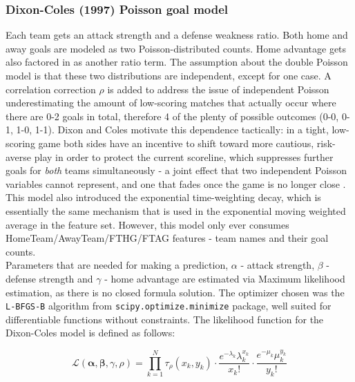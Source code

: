 \documentclass{article}
\begin{document}
\subsubsection{Dixon-Coles (1997) Poisson goal model}

Each team gets an attack strength and a defense weakness ratio. Both home and away goals are modeled as two Poisson-distributed counts. Home advantage gets also factored in as another ratio term. The assumption about the double Poisson model is that these two distributions are independent, except for one case. A correlation correction $\rho$ is added to address the issue of independent Poisson underestimating the amount of low-scoring matches that actually occur where there are 0-2 goals in total, therefore 4 of the plenty of possible outcomes (0-0, 0-1, 1-0, 1-1). Dixon and Coles motivate this dependence tactically: in a tight, low-scoring game both sides have an incentive to shift toward more cautious, risk-averse play in order to protect the current scoreline, which suppresses further goals for \textit{both} teams simultaneously - a joint effect that two independent Poisson variables cannot represent, and one that fades once the game is no longer close \cite{DixonColes}. This model also introduced the exponential time-weighting decay, which is essentially the same mechanism that is used in the exponential moving weighted average in the feature set. However, this model only ever consumes HomeTeam/AwayTeam/FTHG/FTAG features - team names and their goal counts. 
\\
Parameters that are needed for making a prediction, $\alpha$ - attack strength, $\beta$ - defense strength and $\gamma$ - home advantage are estimated via Maximum likelihood estimation, as there is no closed formula solution. The optimizer chosen was the \texttt{L-BFGS-B} algorithm from \texttt{scipy.optimize.minimize} package, well suited for differentiable functions without constraints. The likelihood function for the Dixon-Coles model is defined as follows: 

\begin{equation}
\mathcal{L}(\boldsymbol{\alpha}, \boldsymbol{\beta}, \gamma, \rho) = \prod_{k=1}^{N} \tau_\rho(x_k, y_k) \cdot \frac{e^{-\lambda_k}\lambda_k^{x_k}}{x_k!} \cdot \frac{e^{-\mu_k}\mu_k^{y_k}}{y_k!}
\end{equation}
\end{document}

